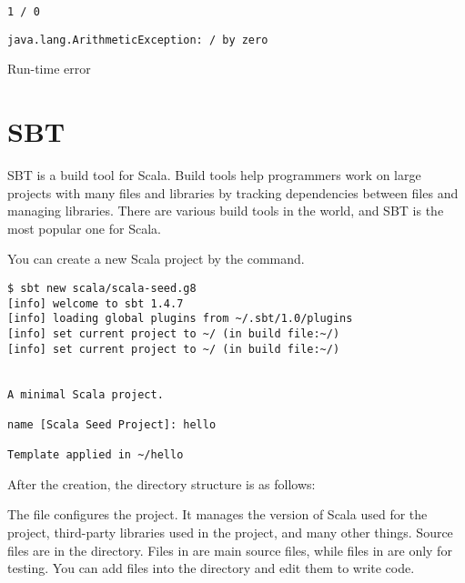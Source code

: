 \begin{verbatim}
1 / 0
\end{verbatim}
\vspace{-1em}
\begin{mdframed}[hidealllines=true,backgroundcolor=red!10,innerleftmargin=3pt,innerrightmargin=3pt,leftmargin=-3pt,rightmargin=-3pt]
\begin{verbatim}
java.lang.ArithmeticException: / by zero
\end{verbatim}
\vspace{-2em}
\begin{flushright}
\scriptsize\textsf{Run-time error}
\end{flushright}
\end{mdframed}

\section{SBT}

SBT is a build tool for Scala. Build tools help programmers work on large
projects with many files and libraries by tracking dependencies between files
and managing libraries. There are various build tools in the world, and SBT is
the most popular one for Scala.

You can create a new Scala project by the  command.

\begin{verbatim}
$ sbt new scala/scala-seed.g8
[info] welcome to sbt 1.4.7
[info] loading global plugins from ~/.sbt/1.0/plugins
[info] set current project to ~/ (in build file:~/)
[info] set current project to ~/ (in build file:~/)


A minimal Scala project.

name [Scala Seed Project]: hello

Template applied in ~/hello
\end{verbatim}

After the creation, the directory structure is as follows:


The  file configures the project. It manages the version of Scala
used for the project, third-party libraries used in the project, and many other
things.
Source files are in the  directory. Files in  are
main source files, while files in  are only for testing.
You can add files into the  directory and edit them to write code.

